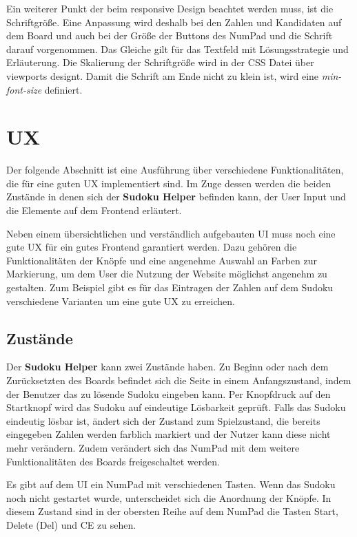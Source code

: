 Ein weiterer Punkt der beim responsive Design beachtet werden muss, ist die Schriftgröße. Eine Anpassung wird deshalb bei den Zahlen und Kandidaten auf dem Board und auch bei der Größe der Buttons des NumPad und die Schrift darauf vorgenommen. Das Gleiche gilt für das Textfeld mit Lösungsstrategie und Erläuterung. Die Skalierung der Schriftgröße wird in der \ac{CSS} Datei über viewports designt. Damit die Schrift am Ende nicht zu klein ist, wird eine \textit{min-font-size} definiert. 


\section{\acl{UX}}
Der folgende Abschnitt ist eine Ausführung über verschiedene Funktionalitäten, die für eine guten \acl{UX} implementiert sind. Im Zuge dessen werden die beiden Zustände in denen sich der \textbf{Sudoku Helper} befinden kann, der User Input und die Elemente auf dem Frontend erläutert.

Neben einem übersichtlichen und verständlich aufgebauten \ac{UI} muss noch eine gute \ac{UX} für ein gutes Frontend garantiert werden. Dazu gehören die Funktionalitäten der Knöpfe und eine angenehme Auswahl an Farben zur Markierung, um dem User die Nutzung der Website möglichst angenehm zu gestalten. Zum Beispiel gibt es für das Eintragen der Zahlen auf dem Sudoku verschiedene Varianten um eine gute \ac{UX} zu erreichen. 

\subsection{Zustände}

Der \textbf{Sudoku Helper} kann zwei Zustände haben. Zu Beginn oder nach dem Zurücksetzten des Boards befindet sich die Seite in einem Anfangszustand, indem der Benutzer das zu lösende Sudoku eingeben kann. Per Knopfdruck auf den Startknopf wird das Sudoku auf eindeutige Lösbarkeit geprüft. Falls das Sudoku eindeutig lösbar ist, ändert sich der Zustand zum \glqq Spielzustand\grqq, die bereits eingegeben Zahlen werden farblich markiert und der Nutzer kann diese nicht mehr verändern. Zudem verändert sich das NumPad mit dem weitere Funktionalitäten des Boards freigeschaltet werden. 

Es gibt auf dem \ac{UI} ein NumPad mit verschiedenen Tasten. Wenn das Sudoku noch nicht gestartet wurde, unterscheidet sich die Anordnung der Knöpfe. In diesem Zustand sind in der obersten Reihe auf dem NumPad die Tasten Start, Delete (Del) und \ac{CE} zu sehen. 

